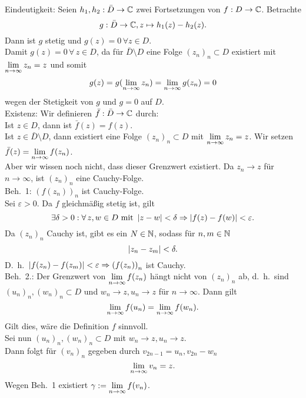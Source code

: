 \documentclass[../ana1.tex]{subfiles}
\begin{document}
\begin{bew}
    Eindeutigkeit: Seien \( h_1,h_2 : \bar{D} 
    \rightarrow \mathbb{C} \) zwei Fortsetzungen von 
    \( f : D \rightarrow \mathbb{C} \). Betrachte 
    \[ g: \bar{D} \rightarrow \mathbb{C}, z \mapsto 
    h_1(z) - h_2(z). \]
    Dann ist \(g\) stetig und \( g(z) = 0 
    \, \forall z\in D \).\\
    Damit \( g(z) = 0 \,\forall \, z \in D \), da für 
    \( \bar{D} \setminus D \) eine Folge 
    \( {(z_n)}_n \subset D \) existiert mit 
    \( \lim\limits_{n\rightarrow\infty} z_n = z \) und somit 
    \[ g(z) = g(\lim\limits_{n\rightarrow\infty} z_n) = \lim\limits_{n\rightarrow\infty} g(z_n) = 0 \]
    wegen der Stetigkeit von \(g\) und \( g=0 \) auf \(D\).\\
    Existenz: Wir definieren \( \bar{f}: \bar{D} 
    \rightarrow \mathbb{C} \) durch:\\
    Ist \( z\in D \), dann ist \( \bar{f}(z) = f(z) \).\\
    Ist \( z\in \bar{D}\setminus D \), dann existiert
    eine Folge \( {(z_n)}_n \subset D \) mit 
    \( \lim\limits_{n\rightarrow\infty} z_n = z \). Wir setzen \( \bar{f}(z) 
    = \lim\limits_{n\rightarrow\infty} f(z_n) \).\\
    Aber wir wissen noch nicht, dass dieser Grenzwert 
    existiert. Da \(z_n \rightarrow z\) für 
    \(n\rightarrow \infty \), ist \( {(z_n)}_n \) eine 
    Cauchy-Folge.\\
    Beh.\ 1: \( {(f(z_n))}_n \) ist Cauchy-Folge.\\
    Sei \( \varepsilon > 0 \). Da \(f\) gleichmäßig stetig 
    ist, gilt 
    \[ \exists \delta > 0 : \forall \, z, w \in D 
    \text{ mit } \left|z-w\right| < \delta \Rightarrow 
    \left|f(z) - f(w)\right| < \varepsilon. \]
    Da \( {(z_n)}_n \) Cauchy ist, gibt es ein \( N\in\mathbb{N} \), 
    sodass für \( n,m\in\mathbb{N} \)
    \[ \left|z_n - z_m\right| < \delta. \]
    D.\ h.\  \( \left|f(z_n) - f(z_m)\right| < \varepsilon 
    \Rightarrow {(f(z_n))}_n \) ist Cauchy.\\
    Beh.\ 2.: Der Grenzwert von \( \lim\limits_{n\rightarrow\infty} f(z_n) \)
    hängt nicht von \( {(z_n)}_n \) ab, d.\ h.\ sind 
    \( {(u_n)}_n, {(w_n)}_n \subset D \) und 
    \( w_n \rightarrow z, u_n \rightarrow z \) für 
    \(n\rightarrow \infty \). Dann gilt 
    \[ \lim\limits_{n\rightarrow\infty} f(u_n) = \lim\limits_{n\rightarrow\infty} f(w_n). \]
    Gilt dies, wäre die Definition \(f\) sinnvoll.\\
    Sei nun \( {(u_n)}_n, {(w_n)}_n \subset D \) mit 
    \( w_n \rightarrow z, u_n \rightarrow z \). \\
    Dann folgt für \( {(v_n)}_n \) gegeben durch 
    \( v_{2n-1} = u_n, v_{2n} - w_n \)
    \[ \lim\limits_{n\rightarrow\infty} v_n = z. \]
    Wegen Beh.\ 1 existiert \( \gamma := \lim\limits_{n\rightarrow\infty} f(v_n) \).\\

\end{bew}
\end{document}
